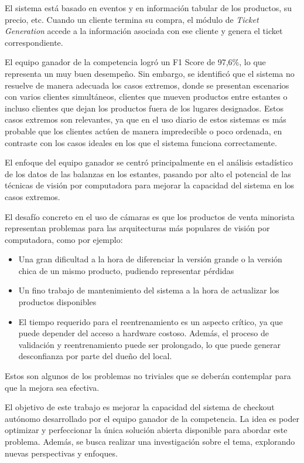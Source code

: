 \documentclass[
11pt, %
codirector, %
]{charter}
\begin{document}
El sistema está basado en eventos y en información tabular de los productos, su precio, etc. Cuando un cliente termina su compra, el módulo de \textit{Ticket Generation} accede a la información asociada con ese cliente y genera el ticket correspondiente. 

El equipo ganador de la competencia logró un F1 Score de 97,6\%, lo que representa un muy buen desempeño. Sin embargo, se identificó que el sistema no resuelve de manera adecuada los casos extremos, donde se presentan escenarios con varios clientes simultáneos, clientes que mueven productos entre estantes o incluso clientes que dejan los productos fuera de los lugares designados. Estos casos extremos son relevantes, ya que en el uso diario de estos sistemas es más probable que los clientes actúen de manera impredecible o poco ordenada, en contraste con los casos ideales en los que el sistema funciona correctamente.

El enfoque del equipo ganador se centró principalmente en el análisis estadístico de los datos de las balanzas en los estantes, pasando por alto el potencial de las técnicas de visión por computadora para mejorar la capacidad del sistema en los casos extremos.

El desafío concreto en el uso de cámaras es que los productos de venta minorista representan problemas para las arquitecturas más populares de visión por computadora, como por ejemplo:
\begin{itemize}
	\item Una gran dificultad a la hora de diferenciar la versión grande o la versión chica de un mismo producto, pudiendo representar pérdidas
	\item Un fino trabajo de mantenimiento del sistema a la hora de actualizar los productos disponibles
	\item El tiempo requerido para el reentrenamiento es un aspecto crítico, ya que puede depender del acceso a hardware costoso. Además, el proceso de validación y reentrenamiento puede ser prolongado, lo que puede generar desconfianza por parte del dueño del local.
\end{itemize}
Estos son algunos de los problemas no triviales que se deberán contemplar para que la mejora sea efectiva.

El objetivo de este trabajo es mejorar la capacidad del sistema de checkout autónomo desarrollado por el equipo ganador de la competencia. La idea es poder optimizar y perfeccionar la única solución abierta disponible para abordar este problema. Además, se busca realizar una investigación sobre el tema, explorando nuevas perspectivas y enfoques.
\end{document}
